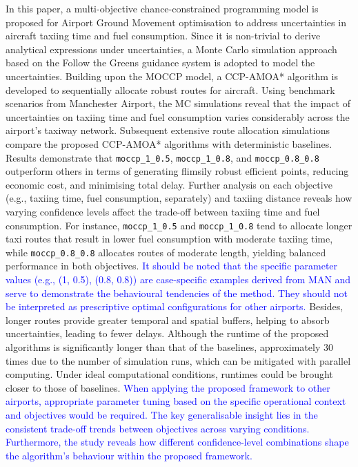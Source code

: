 \documentclass{article}
\begin{document}
In this paper, a multi-objective chance-constrained programming model is proposed for Airport Ground Movement optimisation to address uncertainties in aircraft taxiing time and fuel consumption. Since it is non-trivial to derive analytical expressions under uncertainties, a Monte Carlo simulation approach based on the Follow the Greens guidance system is adopted to model the uncertainties. Building upon the MOCCP model, a CCP-AMOA* algorithm is developed to sequentially allocate robust routes for aircraft. Using benchmark scenarios from Manchester Airport, the MC simulations reveal that the impact of uncertainties on taxiing time and fuel consumption varies considerably across the airport’s taxiway network. Subsequent extensive route allocation simulations compare the proposed CCP-AMOA* algorithms with deterministic baselines. Results demonstrate that \texttt{moccp\_1\_0.5}, \texttt{moccp\_1\_0.8}, and \texttt{moccp\_0.8\_0.8} outperform others in terms of generating flimsily robust efficient points, reducing economic cost, and minimising total delay. Further analysis on each objective (e.g., taxiing time, fuel consumption, separately) and taxiing distance reveals how varying confidence levels affect the trade-off between taxiing time and fuel consumption. For instance, \texttt{moccp\_1\_0.5} and \texttt{moccp\_1\_0.8} tend to allocate longer taxi routes that result in lower fuel consumption with moderate taxiing time, while \texttt{moccp\_0.8\_0.8} allocates routes of moderate length, yielding balanced performance in both objectives. \textcolor{blue}{It should be noted that the specific parameter values (e.g., (1, 0.5), (0.8, 0.8)) are case-specific examples derived from MAN and serve to demonstrate the behavioural tendencies of the method. They should not be interpreted as prescriptive optimal configurations for other airports.} Besides, longer routes provide greater temporal and spatial buffers, helping to absorb uncertainties, leading to fewer delays. Although the runtime of the proposed algorithms is significantly longer than that of the baselines, approximately 30 times due to the number of simulation runs, which can be mitigated with parallel computing. Under ideal computational conditions, runtimes could be brought closer to those of baselines. \textcolor{blue}{When applying the proposed framework to other airports, appropriate parameter tuning based on the specific operational context and objectives would be required. The key generalisable insight lies in the consistent trade-off trends between objectives across varying conditions. Furthermore, the study reveals how different confidence-level combinations shape the algorithm's behaviour within the proposed framework.}
\end{document}
